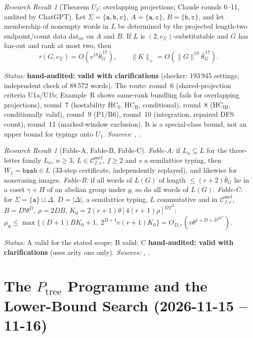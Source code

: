 \documentclass[11pt]{article}
\numberwithin{equation}{section}
\theoremstyle{plain}
\theoremstyle{definition}
\theoremstyle{remark}
\newtheorem{rresult}[theorem]{Research Result}
\newcommand{\Cmcf}[2]{\mathcal{C}^{\mathrm{mcf}}_{#1,#2}}
\theoremstyle{plain}
\begin{document}
\begin{rresult}[Theorem $U_2$: overlapping projections; Claude rounds 6--11, audited by ChatGPT]
\label{rr:theorem-U2}
Let $\Sigma=\{\mathtt a,\mathtt b,\mathtt c\}$, $A=\{\mathtt a,\mathtt c\}$, $B=\{\mathtt b,\mathtt c\}$, and let
membership of nonempty words in $L$ be determined by the projected length-two
endpoint/count data $\mathrm{dat}_{\mathrm{ov}}$ on $A$ and $B$.  If $L$ is
$(2,c_\Sigma)$-substitutable and $G$ has fan-out and rank at most two, then
\[
 \tau(G,c_\Sigma)=O(v^{18}\bar\theta_G^{\,17}),\qquad
 \|K\|_+=O(\|G\|^{19}\bar\theta_G^{\,17}).
\]
\end{rresult}
\noindent\emph{Status:} \textbf{hand-audited: valid with clarifications} (checker:
193\,945 settings; independent check of 88\,572 words).  The route: round~6
(shared-projection criteria U1a/U1b; Example~R shows same-rank bundling fails for
overlapping projections), round~7 (hostability $\mathrm{HC}_{\mathrm I}$, $\mathrm{HC}_{\mathrm{II}}$,
conditional), round~8 ($\mathrm{HC}_{\mathrm{III}}$, conditionally valid), round~9 (P1/B6),
round~10 (integration, repaired DFS count), round~11 (marked-window exclusion).  It is a
special-class bound, not an upper bound for typings onto $U_1$.  \emph{Sources:}
,
.

\begin{rresult}[Fable-A, Fable-B, Fable-C]
\label{rr:fable-abc}
\emph{Fable-A:} if $L_n\subseteq L$ for the three-letter family $L_n$, $n\ge3$,
$L\in\Cmcf{f}{s}$, $f\ge2$ and $s$ a semilattice typing, then
$W_1=\mathtt{baab}\in L$ (33-step certificate, independently replayed), and likewise for
nonerasing images.  \emph{Fable-B:} if all words of $L(G)$ of length
$\le(r+2)\bar\theta_G$ lie in a coset $\gamma+H$ of an abelian group under $g$, so do all
words of $L(G)$.  \emph{Fable-C:} for $\Sigma=\{\mathtt a\}\sqcup\Delta$, $D=|\Delta|$, a
semilattice typing, $L$ commutative and in $\Cmcf{f}{s}$, $B=D!\theta^D$, $\rho=2DB$,
$K_0=2(r+1)\theta[4(r+1)\rho]^{D2^D}$:
$\mu_{\mathtt a}\le\max\{(D+1)BK_0+1,\ 2^{D+1}v(r+1)K_0\}=O_{D,r}(v\theta^{1+D+D^22^D})$.
\end{rresult}
\noindent\emph{Status:} A valid for the stated scope; B valid; C \textbf{hand-audited:
valid with clarifications} (uses arity one only).  \emph{Sources:}
,
.

\section{The \texorpdfstring{$P_{\mathrm{tree}}$}{P-tree} Programme and the Lower-Bound Search (2026-11-15 -- 11-16)}
\label{sec:p4-ptree}
\end{document}
